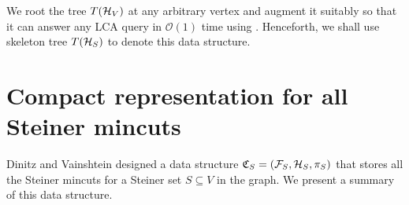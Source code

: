 
We root the tree $T({\cal H}_V)$ at any arbitrary vertex and augment it suitably so that it can answer any LCA query in $\mathcal O(1)$ time using \cite{DBLP:journals/jal/BenderFPSS05}. Henceforth, we shall use skeleton tree $T({\cal H}_S)$ to denote this data structure.

\section{Compact representation for all Steiner mincuts} \label{subsec:connectivity-carcass}

Dinitz and Vainshtein \cite{DBLP:conf/stoc/DinitzV94} designed a data structure $\mathfrak{C}_S = ({\cal F}_S,{\cal H}_S, \pi_S)$ that stores all the Steiner mincuts for a Steiner set $S\subseteq V$ in the graph. We present a summary of this data structure.

